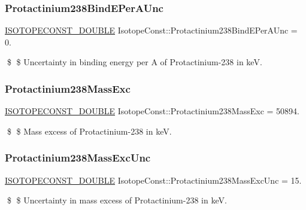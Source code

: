 \subsubsection{\texorpdfstring{Protactinium238\+Bind\+E\+Per\+A\+Unc}{Protactinium238BindEPerAUnc}}
{\footnotesize\ttfamily \mbox{\hyperlink{group___isotope_const-_macros_ga8f45a7272ce02c0b4c65c44636ed719a}{I\+S\+O\+T\+O\+P\+E\+C\+O\+N\+S\+T\+\_\+\+D\+O\+U\+B\+LE}} Isotope\+Const\+::\+Protactinium238\+Bind\+E\+Per\+A\+Unc = 0.}

\$ \$ Uncertainty in binding energy per A of Protactinium-\/238 in keV. \mbox{\label{group___isotope_const-_protactinium-_pa238_ga8462c3342c67cb1dc3880cec52602989}} 
\subsubsection{\texorpdfstring{Protactinium238\+Mass\+Exc}{Protactinium238MassExc}}
{\footnotesize\ttfamily \mbox{\hyperlink{group___isotope_const-_macros_ga8f45a7272ce02c0b4c65c44636ed719a}{I\+S\+O\+T\+O\+P\+E\+C\+O\+N\+S\+T\+\_\+\+D\+O\+U\+B\+LE}} Isotope\+Const\+::\+Protactinium238\+Mass\+Exc = 50894.}

\$ \$ Mass excess of Protactinium-\/238 in keV. \mbox{\label{group___isotope_const-_protactinium-_pa238_ga7b21780b95d98fbccaff07aaeb035375}} 
\subsubsection{\texorpdfstring{Protactinium238\+Mass\+Exc\+Unc}{Protactinium238MassExcUnc}}
{\footnotesize\ttfamily \mbox{\hyperlink{group___isotope_const-_macros_ga8f45a7272ce02c0b4c65c44636ed719a}{I\+S\+O\+T\+O\+P\+E\+C\+O\+N\+S\+T\+\_\+\+D\+O\+U\+B\+LE}} Isotope\+Const\+::\+Protactinium238\+Mass\+Exc\+Unc = 15.}

\$ \$ Uncertainty in mass excess of Protactinium-\/238 in keV. \mbox{\label{group___isotope_const-_protactinium-_pa238_ga23bb567ce2ebf0405fd6265220ef898a}} 
